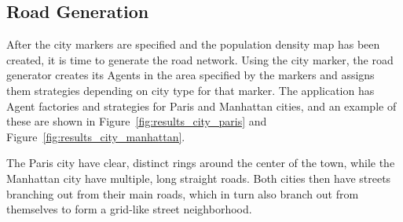 \subsection{Road Generation}

After the city markers are specified and the population density map has been created, it is time to generate the road network.
Using the city marker, the road generator creates its Agents in the area specified by the markers and assigns them strategies depending on city type for that marker.
The application has Agent factories and strategies for Paris and Manhattan cities, and an example of these are shown in Figure~\ref{fig:results_city_paris} and Figure~\ref{fig:results_city_manhattan}.

The Paris city have clear, distinct rings around the center of the town, while the Manhattan city have multiple, long straight roads.
Both cities then have streets branching out from their main roads, which in turn also branch out from themselves to form a grid-like street neighborhood.

